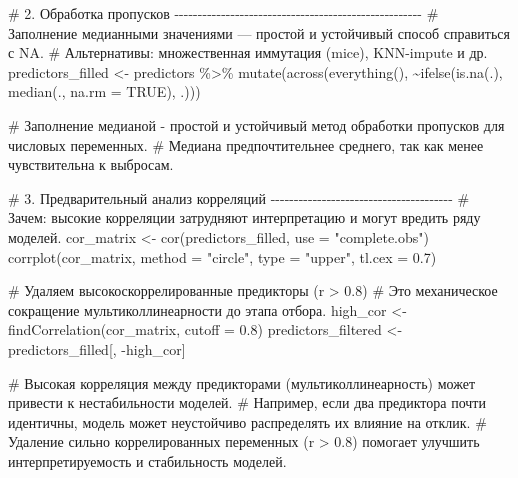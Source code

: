 \documentclass[
  letterpaper,
  DIV=11,
  numbers=noendperiod]{scrreprt}
\newenvironment{Shaded}{\begin{snugshade}}{\end{snugshade}}
\newcommand{\AttributeTok}[1]{\textcolor[rgb]{0.40,0.45,0.13}{#1}}
\newcommand{\CommentTok}[1]{\textcolor[rgb]{0.37,0.37,0.37}{#1}}
\newcommand{\ConstantTok}[1]{\textcolor[rgb]{0.56,0.35,0.01}{#1}}
\newcommand{\FloatTok}[1]{\textcolor[rgb]{0.68,0.00,0.00}{#1}}
\newcommand{\FunctionTok}[1]{\textcolor[rgb]{0.28,0.35,0.67}{#1}}
\newcommand{\NormalTok}[1]{\textcolor[rgb]{0.00,0.23,0.31}{#1}}
\newcommand{\OtherTok}[1]{\textcolor[rgb]{0.00,0.23,0.31}{#1}}
\newcommand{\SpecialCharTok}[1]{\textcolor[rgb]{0.37,0.37,0.37}{#1}}
\newcommand{\StringTok}[1]{\textcolor[rgb]{0.13,0.47,0.30}{#1}}
\begin{document}
\begin{Shaded}
\begin{Highlighting}[]
\CommentTok{\# 2. Обработка пропусков {-}{-}{-}{-}{-}{-}{-}{-}{-}{-}{-}{-}{-}{-}{-}{-}{-}{-}{-}{-}{-}{-}{-}{-}{-}{-}{-}{-}{-}{-}{-}{-}{-}{-}{-}{-}{-}{-}{-}{-}{-}{-}{-}{-}{-}{-}{-}{-}{-}{-}{-}{-}{-}}
\CommentTok{\# Заполнение медианными значениями — простой и устойчивый способ справиться с NA.}
\CommentTok{\# Альтернативы: множественная иммутация (mice), KNN{-}impute и др.}
\NormalTok{predictors\_filled }\OtherTok{\textless{}{-}}\NormalTok{ predictors }\SpecialCharTok{\%\textgreater{}\%}
  \FunctionTok{mutate}\NormalTok{(}\FunctionTok{across}\NormalTok{(}\FunctionTok{everything}\NormalTok{(), }\SpecialCharTok{\textasciitilde{}}\FunctionTok{ifelse}\NormalTok{(}\FunctionTok{is.na}\NormalTok{(.), }\FunctionTok{median}\NormalTok{(., }\AttributeTok{na.rm =} \ConstantTok{TRUE}\NormalTok{), .)))}

\CommentTok{\# Заполнение медианой {-} простой и устойчивый метод обработки пропусков для числовых переменных.}
\CommentTok{\# Медиана предпочтительнее среднего, так как менее чувствительна к выбросам.}

\CommentTok{\# 3. Предварительный анализ корреляций {-}{-}{-}{-}{-}{-}{-}{-}{-}{-}{-}{-}{-}{-}{-}{-}{-}{-}{-}{-}{-}{-}{-}{-}{-}{-}{-}{-}{-}{-}{-}{-}{-}{-}{-}{-}{-}{-}{-}}
\CommentTok{\# Зачем: высокие корреляции затрудняют интерпретацию и могут вредить ряду моделей.}
\NormalTok{cor\_matrix }\OtherTok{\textless{}{-}} \FunctionTok{cor}\NormalTok{(predictors\_filled, }\AttributeTok{use =} \StringTok{"complete.obs"}\NormalTok{)}
\FunctionTok{corrplot}\NormalTok{(cor\_matrix, }\AttributeTok{method =} \StringTok{"circle"}\NormalTok{, }\AttributeTok{type =} \StringTok{"upper"}\NormalTok{, }\AttributeTok{tl.cex =} \FloatTok{0.7}\NormalTok{)}


\CommentTok{\# Удаляем высокоскоррелированные предикторы (r \textgreater{} 0.8)}
\CommentTok{\# Это механическое сокращение мультиколлинеарности до этапа отбора.}
\NormalTok{high\_cor }\OtherTok{\textless{}{-}} \FunctionTok{findCorrelation}\NormalTok{(cor\_matrix, }\AttributeTok{cutoff =} \FloatTok{0.8}\NormalTok{)}
\NormalTok{predictors\_filtered }\OtherTok{\textless{}{-}}\NormalTok{ predictors\_filled[, }\SpecialCharTok{{-}}\NormalTok{high\_cor]}

\CommentTok{\# Высокая корреляция между предикторами (мультиколлинеарность) может привести к нестабильности моделей.}
\CommentTok{\# Например, если два предиктора почти идентичны, модель может неустойчиво распределять их влияние на отклик.}
\CommentTok{\# Удаление сильно коррелированных переменных (r \textgreater{} 0.8) помогает улучшить интерпретируемость и стабильность моделей.}



\end{Highlighting}
\end{Shaded}
\end{document}
